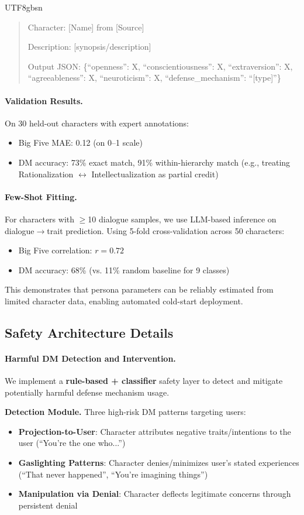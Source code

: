\documentclass[11pt]{article}
\begin{document}
\begin{CJK*}{UTF8}{gbsn}
\begin{quote}
Character: [Name] from [Source]

Description: [synopsis/description]

Output JSON: \{``openness'': X, ``conscientiousness'': X, ``extraversion'': X, ``agreeableness'': X, ``neuroticism'': X, ``defense\_mechanism'': ``[type]''\}
\end{quote}

\paragraph{Validation Results.} On 30 held-out characters with expert annotations:
\begin{itemize}
    \item Big Five MAE: 0.12 (on 0--1 scale)
    \item DM accuracy: 73\% exact match, 91\% within-hierarchy match (e.g., treating Rationalization $\leftrightarrow$ Intellectualization as partial credit)
\end{itemize}

\paragraph{Few-Shot Fitting.} For characters with $\geq$10 dialogue samples, we use LLM-based inference on dialogue$\rightarrow$trait prediction. Using 5-fold cross-validation across 50 characters:
\begin{itemize}
    \item Big Five correlation: $r=0.72$
    \item DM accuracy: 68\% (vs. 11\% random baseline for 9 classes)
\end{itemize}
This demonstrates that persona parameters can be reliably estimated from limited character data, enabling automated cold-start deployment.

\subsection{Safety Architecture Details}
\label{sec:safety_details}

\paragraph{Harmful DM Detection and Intervention.}
We implement a \textbf{rule-based + classifier} safety layer to detect and mitigate potentially harmful defense mechanism usage.

\textbf{Detection Module.} Three high-risk DM patterns targeting users:
\begin{itemize}
    \item \textbf{Projection-to-User}: Character attributes negative traits/intentions to the user (``You're the one who...'')
    \item \textbf{Gaslighting Patterns}: Character denies/minimizes user's stated experiences (``That never happened'', ``You're imagining things'')
    \item \textbf{Manipulation via Denial}: Character deflects legitimate concerns through persistent denial
\end{itemize}


\end{CJK*}
\end{document}
